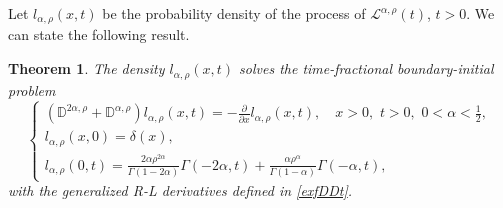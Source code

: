 \documentclass[12pt]{article}
\theoremstyle{definition}
\theoremstyle{plain}
\newtheorem{theorem}{Theorem}
\begin{document}
Let $l_{\alpha,\rho}(x,t)$ be the probability density of the process of $\mathcal{L}^{\alpha,\rho}(t)$, $t > 0$. We can state the following result.
\begin{theorem}	
	{The density $l_{\alpha,\rho}(x,t)$  solves the time-fractional boundary-initial problem}
	\begin{equation}\label{temp3}
		\begin{cases}
			(\mathbb{D}^{2\alpha,\rho} + \mathbb{D}^{\alpha,\rho}) l_{\alpha, \rho}(x,t) = -\frac{\partial}{\partial x} l_{\alpha, \rho}(x,t), \quad x > 0,\,\, t > 0,\,\, 0 < \alpha < \frac{1}{2},  \\
			l_{\alpha, \rho}(x,0) = \delta(x), \\
			l_{\alpha, \rho}(0,t) = \frac{2\alpha \rho^{2\alpha}}{\Gamma(1-2\alpha)} \Gamma(-2\alpha, t) + \frac{\alpha \rho^\alpha}{\Gamma(1-\alpha)} \Gamma(-\alpha, t),
		\end{cases}
			\end{equation}
with the generalized R-L derivatives defined in \eqref{exfDDt}.
\end{theorem}	
\end{document}
